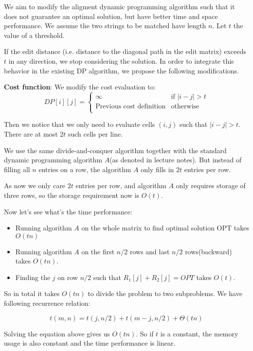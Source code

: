 
We aim to modify the aligment dynamic programming algorithm such that it does not guarantee an optimal solution, but have better time and space performance. We assume the two strings to be matched have length $n$. Let $t$ the value of a threshold.

If the edit distance (i.e. distance to the diagonal path in the edit matrix) exceeds $t$ in any direction, we stop considering the solution. In order to integrate this behavior in the existing DP algorithm, we propose the following modifications.

\textbf{Cost function}: We modify the cost evaluation to:
\[
  DP[i][j] = \left \{
    \begin{array}{ll}
      \infty & \text{if } |i - j| > t \\
      \text{Previous cost definition} & \text{otherwise} \\
    \end{array}
  \right.
\]

Then we notice that we only need to evaluate cells $(i, j)$ such that $|i - j| > t$. There are at most $2t$ such cells per line.

We use the same divide-and-conquer algorithm together with the standard dynamic programming algorithm $A$(as denoted in lecture notes). But instead of filling all $n$ entries on a row, the algorithm $A$ only fills in $2t$ entries per row.

As now we only care $2t$ entries per row, and algorithm $A$ only requires storage of three rows, so the storage requirement now is $O(t)$.

Now let's see what's the time performance:

\begin{itemize}
\item Running algorithm $A$ on the whole matrix to find optimal solution OPT takes $O(tn)$
\item Running algorithm $A$ on the first $n/2$ rows and last $n/2$ rows(backward) takes $O(tn)$.
\item Finding the $j$ on row $n/2$ such that $R_1[j] + R_2[j] = OPT$ takes $O(t)$.
\end{itemize}

So in total it takes $O(tn)$ to divide the problem to two subproblems. We have following recurrence relation:

\[
t(m,n) = t(j, n/2) + t(m−j,n/2) + \Theta(tn)
\]

Solving the equation above gives us $O(tn)$. So if $t$ is a constant, the memory usage is also constant and the time performance is linear.
